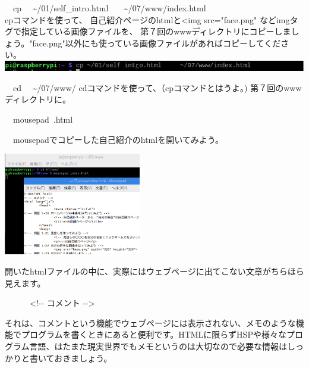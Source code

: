 \documentclass[a4paper,12pt,dvipdfmx]{jarticle}
\begin{document}
\begin{minipage}[b]{0.5\textwidth}
	\begin{enumerate}
		\begin{minipage}[b]{1.5\textwidth}
			\item \ \ cp \ \ {\textasciitilde}/01/self\_intro.html \ \ \ {\textasciitilde}/07/www/index.html\\
			cpコマンドを使って、 自己紹介ページのhtmlと<img src="face.png" などimgタグで指定している画像ファイルを、 第７回のwwwディレクトリにコピーしましょう。"face.png"以外にも使っている画像ファイルがあればコピーしてください。\\
			\includegraphics[width=14.73cm]{ome7-img033.png}
		\end{minipage}

		\bigskip

		\item

		      \ \ cd \ \ {\textasciitilde}/07/www/\newline
		      cdコマンドを使って、（cpコマンドとはうよ。) 第７回のwwwディレクトリに。


		\item \ \ mousepad\ \index.html

		      \ \ mousepadでコピーした自己紹介のhtmlを開いてみよう。

	\end{enumerate}
\end{minipage}
\includegraphics[width=0.45\textwidth]{ome7-img034.png}

\bigskip

開いたhtmlファイルの中に、実際にはウェブページに出てこない文章がちらほら見えます。

\ \ \ \ \ \ {\textless}!-{}- コメント -{}-{\textgreater}

それは、コメントという機能でウェブページには表示されない、メモのような機能でプログラムを書くときにあると便利です。HTMLに限らずHSPや様々なプログラム言語、はたまた現実世界でもメモというのは大切なので必要な情報はしっかりと書いておきましょう。
\end{document}

